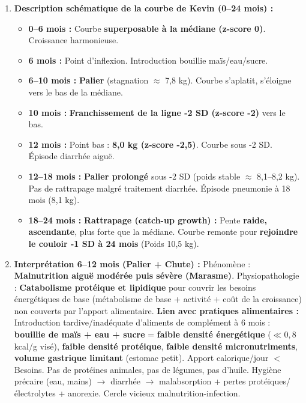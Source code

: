 \documentclass[11pt]{article}
\begin{document}
\begin{corrige}
\begin{enumerate}
    \item \textbf{Description schématique de la courbe de Kevin (0–24 mois) :}
    \begin{itemize}
        \item \textbf{0–6 mois :} Courbe \textbf{superposable à la médiane (z-score 0)}. Croissance harmonieuse.
        \item \textbf{6 mois :} Point d'inflexion. Introduction bouillie maïs/eau/sucre.
        \item \textbf{6–10 mois :} \textbf{Palier} (stagnation $\approx$ 7,8 kg). Courbe s'aplatit, s'éloigne vers le bas de la médiane.
        \item \textbf{10 mois :} \textbf{Franchissement de la ligne -2 SD (z-score -2)} vers le bas.
        \item \textbf{12 mois :} Point bas : \textbf{8,0 kg (z-score -2,5)}. Courbe sous -2 SD. Épisode diarrhée aiguë.
        \item \textbf{12–18 mois :} \textbf{Palier prolongé} sous -2 SD (poids stable $\approx$ 8,1–8,2 kg). Pas de rattrapage malgré traitement diarrhée. Épisode pneumonie à 18 mois (8,1 kg).
        \item \textbf{18–24 mois :} \textbf{Rattrapage (catch-up growth) :} Pente \textbf{raide, ascendante}, plus forte que la médiane. Courbe remonte pour \textbf{rejoindre le couloir -1 SD à 24 mois} (Poids 10,5 kg).
    \end{itemize}
    \item \textbf{Interprétation 6–12 mois (Palier + Chute) :} Phénomène : \textbf{Malnutrition aiguë modérée puis sévère (Marasme)}. Physiopathologie : \textbf{Catabolisme protéique et lipidique} pour couvrir les besoins énergétiques de base (métabolisme de base + activité + coût de la croissance) non couverts par l'apport alimentaire.
    \textbf{Lien avec pratiques alimentaires :} Introduction tardive/inadéquate d'aliments de complément à 6 mois : \textbf{bouillie de maïs + eau + sucre} = \textbf{faible densité énergétique} ($\ll 0,8$ kcal/g visé), \textbf{faible densité protéique}, \textbf{faible densité micronutriments}, \textbf{volume gastrique limitant} (estomac petit). Apport calorique/jour $<$ Besoins. Pas de protéines animales, pas de légumes, pas d'huile. Hygiène précaire (eau, mains) $\rightarrow$ diarrhée $\rightarrow$ malabsorption + pertes protéiques/électrolytes + anorexie. Cercle vicieux malnutrition-infection.

\end{enumerate}
\end{corrige}
\end{document}
